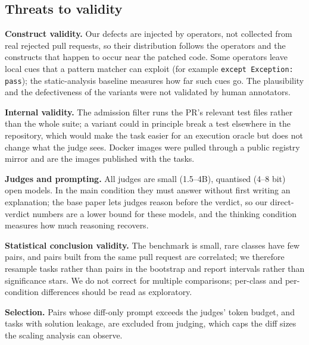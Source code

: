 \subsection{Threats to validity}
\label{sec:threats}

\textbf{Construct validity.}  Our defects are injected by operators, not
collected from real rejected pull requests, so their distribution follows the
operators and the constructs that happen to occur near the patched code.  Some
operators leave local cues that a pattern matcher can exploit (for example
\texttt{except Exception: pass}); the static-analysis baseline measures how far
such cues go.  The plausibility and the defectiveness of the variants were not
validated by human annotators.

\textbf{Internal validity.}  The admission filter runs the PR's relevant test
files rather than the whole suite; a variant could in principle break a test
elsewhere in the repository, which would make the task easier for an execution
oracle but does not change what the judge sees.  Docker images were pulled
through a public registry mirror and are the images published with the tasks.

\textbf{Judges and prompting.}  All judges are small (1.5--4B), quantised
(4--8 bit) open models.  In the main condition they must answer without first
writing an explanation; the base paper lets judges reason before the verdict,
so our direct-verdict numbers are a lower bound for these models, and the
thinking condition measures how much reasoning recovers.

\textbf{Statistical conclusion validity.}  The benchmark is small, rare classes
have few pairs, and pairs built from the same pull request are correlated; we
therefore resample tasks rather than pairs in the bootstrap and report
intervals rather than significance stars.  We do not correct for multiple
comparisons; per-class and per-condition differences should be read as
exploratory.

\textbf{Selection.}  Pairs whose diff-only prompt exceeds the judges' token
budget, and tasks with solution leakage, are excluded from judging, which caps
the diff sizes the scaling analysis can observe.
